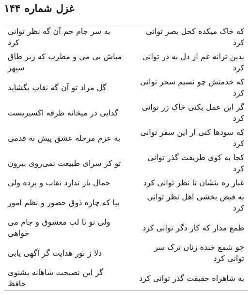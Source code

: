 \begin{center}
\section*{غزل شماره ۱۴۴}
\label{sec:sh144}
\begin{longtable}{l p{0.5cm} r}
به سر جام جم آن گه نظر توانی کرد
&&
که خاک میکده کحل بصر توانی کرد
\\
مباش بی می و مطرب که زیر طاق سپهر
&&
بدین ترانه غم از دل به در توانی کرد
\\
گل مراد تو آن گه نقاب بگشاید
&&
که خدمتش چو نسیم سحر توانی کرد
\\
گدایی در میخانه طرفه اکسیریست
&&
گر این عمل بکنی خاک زر توانی کرد
\\
به عزم مرحله عشق پیش نه قدمی
&&
که سودها کنی ار این سفر توانی کرد
\\
تو کز سرای طبیعت نمی‌روی بیرون
&&
کجا به کوی طریقت گذر توانی کرد
\\
جمال یار ندارد نقاب و پرده ولی
&&
غبار ره بنشان تا نظر توانی کرد
\\
بیا که چاره ذوق حضور و نظم امور
&&
به فیض بخشی اهل نظر توانی کرد
\\
ولی تو تا لب معشوق و جام می خواهی
&&
طمع مدار که کار دگر توانی کرد
\\
دلا ز نور هدایت گر آگهی یابی
&&
چو شمع خنده زنان ترک سر توانی کرد
\\
گر این نصیحت شاهانه بشنوی حافظ
&&
به شاهراه حقیقت گذر توانی کرد
\\
\end{longtable}
\end{center}
